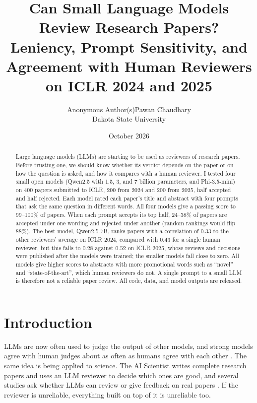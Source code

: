 \documentclass[11pt]{article}
\title{\textbf{Can Small Language Models Review Research Papers?}\\[0.3em]
\large Leniency, Prompt Sensitivity, and Agreement with Human Reviewers on ICLR 2024 and 2025}
\author{\ifanonymous Anonymous Author(s)\else Pawan Chaudhary\\ \small Dakota State University\fi}
\date{October 2026}
\begin{document}
\maketitle

\begin{abstract}
\noindent
Large language models (LLMs) are starting to be used as reviewers of research papers. Before trusting one, we should know whether its verdict depends on the paper or on how the question is asked, and how it compares with a human reviewer. I tested four small open models (Qwen2.5 with 1.5, 3, and 7 billion parameters, and Phi-3.5-mini) on 400 papers submitted to ICLR, 200 from 2024 and 200 from 2025, half accepted and half rejected. Each model rated each paper's title and abstract with four prompts that ask the same question in different words. All four models give a passing score to 99--100\% of papers. When each prompt accepts its top half, 24--38\% of papers are accepted under one wording and rejected under another (random rankings would flip 88\%). The best model, Qwen2.5-7B, ranks papers with a correlation of 0.33 to the other reviewers' average on ICLR 2024, compared with 0.43 for a single human reviewer, but this falls to 0.28 against 0.52 on ICLR 2025, whose reviews and decisions were published after the models were trained; the smaller models fall close to zero. All models give higher scores to abstracts with more promotional words such as ``novel'' and ``state-of-the-art'', which human reviewers do not. A single prompt to a small LLM is therefore not a reliable paper review. All code, data, and model outputs are released.
\end{abstract}

\section{Introduction}

LLMs are now often used to judge the output of other models, and strong models agree with human judges about as often as humans agree with each other \citep{zheng2023judging}. The same idea is being applied to science. The AI Scientist \citep{lu2024aiscientist} writes complete research papers and uses an LLM reviewer to decide which ones are good, and several studies ask whether LLMs can review or give feedback on real papers \citep{liu2023reviewergpt, liang2023feedback, zhou2024reliable}. If the reviewer is unreliable, everything built on top of it is unreliable too.
\end{document}
